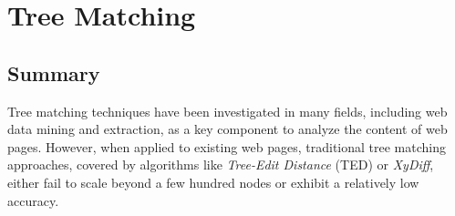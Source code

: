 \chapter{Tree Matching}\label{chap:sftm}
\section*{Summary}
Tree matching techniques have been investigated in many fields, including web data mining and extraction, as a key component to analyze the content of web pages.
However, when applied to existing web pages, traditional tree matching approaches, covered by algorithms like \emph{Tree-Edit Distance} (TED) or \emph{XyDiff}, either fail to scale beyond a few hundred nodes or exhibit a relatively low accuracy.

